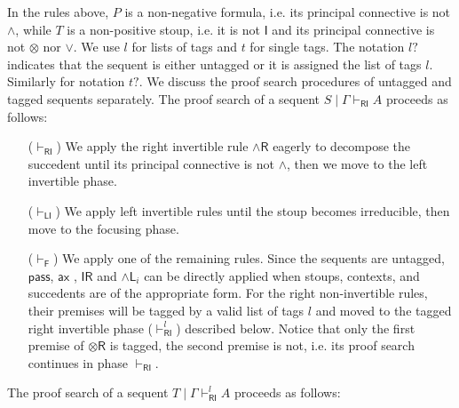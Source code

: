 \documentclass[submission,copyright,creativecommons]{eptcs}
\theoremstyle{definition}
\newcommand{\tr}{\otimes \mathsf{R}}
\newcommand{\pass}{\mathsf{pass}}
\newcommand{\unitr}{\mathsf{IR}}
\newcommand{\andli}{\land \mathsf{L}_{i}}
\newcommand{\andr}{\land \mathsf{R}}
\newcommand{\ax}{\mathsf{ax}}
\newcommand{\ot}{\otimes}
\newcommand{\I}{\mathsf{I}}
\newcommand{\RI}{\mathsf{RI}}
\newcommand{\LI}{\mathsf{LI}}
\newcommand{\Pass}{\mathsf{P}}
\newcommand{\F}{\mathsf{F}}
\begin{document}
In the rules above, $P$ is a non-negative formula, i.e. its principal connective is not $\land$, while $T$ is a non-positive stoup, i.e. it is not $\I$ and its principal connective is not $\ot$ nor $\lor$.
We use $l$ for lists of tags and $t$ for single tags.
The notation $l?$ indicates that the sequent is either untagged or it is assigned the list of tags $l$. Similarly for notation $t?$.
We discuss the proof search procedures of untagged and tagged sequents separately.
The proof search of a sequent $S \mid \Gamma \vdash_\RI A$ proceeds as follows:
\begin{itemize}
  \item[($\vdash_{\RI}$)] We apply the right invertible rule $\andr$ eagerly to decompose the succedent until its principal connective is not $\land$, then we move to the left invertible phase.
  \item[($\vdash_{\LI}$)] We apply left invertible rules until the stoup becomes irreducible, then move to the focusing phase.
  \item[($\vdash_{\F}$)] We apply one of the remaining rules. Since the sequents are untagged, $\pass$, $\ax$ , $\unitr$ and $\andli$ can be directly applied when stoups, contexts, and succedents are of the appropriate form.
  For the right non-invertible rules, their premises will be tagged by a valid list of tags $l$ and moved to the tagged right invertible phase ($\vdash^{l}_{\RI}$) described below. Notice that only the first premise of $\tr$ is tagged, the second premise is not, i.e. its proof search continues in phase $\vdash_{\RI}$.
\end{itemize}
The proof search of a sequent $T \mid \Gamma \vdash^{l}_\RI A$ proceeds as follows:
\end{document}
